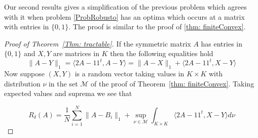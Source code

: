\documentclass[12pt]{amsart}
\theoremstyle{remark}
\begin{document}
Our second results gives a simplification of the previous problem which agrees with it when problem \ref{ProbRobusto} has an optima which occurs at a matrix with entries in $\{0,1\}$. The proof is similar to the proof of \ref{thm: finiteConvex}.


\begin{proof}[Proof of Theorem~\ref{Thm: tractable}]
If the symmetric matrix $A$ has entries in $\{0,1\}$ and $X, Y$ are matrices in $K$ then the following equalities hold
\[\|A-Y\|_1 =\langle 2A-11^t, A-Y\rangle=\|A-X\|_1+\langle 2A-11^t, X-Y\rangle\]
Now suppose $(X,Y)$ is a random vector taking values in $K\times K$ with distribution $\nu$ in the set $\mathcal{M}$ of the proof of Theorem~\ref{thm: finiteConvex}. Taking expected values and suprema we see that

\begin{equation}\label{eq: util}
R_{\delta}(A)= \frac{1}{N}\sum_{i=1}^N \|A-B_i\|_1 + \sup_{\nu\in \mathcal{M}} \int_{K\times K} \langle 2A-11^t, X-Y\rangle d\nu
\end{equation}


\end{proof}
\end{document}
